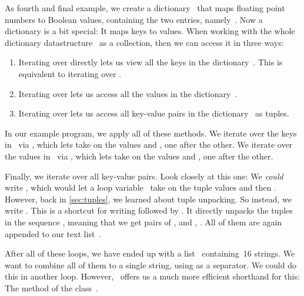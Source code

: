 As fourth and final example, we create a dictionary~ that maps floating point numbers to Boolean values, containing the two entries, namely~.
Now a dictionary is a bit special:
It maps keys to values.
When working with the whole dictionary datastructure~ as a collection, then we can access it in three ways:
%
\begin{enumerate}%
%
\item Iterating over  directly lets us view all the keys in the dictionary~. %
This is equivalent to iterating over .%
%
\item Iterating over  lets us access all the values in the dictionary~.%
%
\item Iterating over  lets us access all key-value pairs in the dictionary~ as tuples.%
\end{enumerate}%
%
In our example program, we apply all of these methods.
We iterate over the keys in~ via , which lets  take on the values  and , one after the other.
We iterate over the values in~ via , which lets  take on the values  and , one after the other.%
%
\begin{sloppypar}%
Finally, we iterate over all key-value pairs.
Look closely at this one:
We \emph{could} write , which would let a loop variable~ take on the tuple values  and then .
However, back in \cref{sec:tuples}, we learned about tuple unpacking.
So instead, we write .
This is a shortcut for writing  followed by .
It directly unpacks the tuples in the sequence , meaning that we get pairs of ,  and , .
All of them are again appended to our text list~.%
\end{sloppypar}%
%
After all of these loops, we have ended up with a list~ containing~16 strings.
We want to combine all of them to a single string, using  as a separator.
We could do this in another loop.
However, \python\ offers us a much more efficient shorthand for this:
The method  of the class~.

